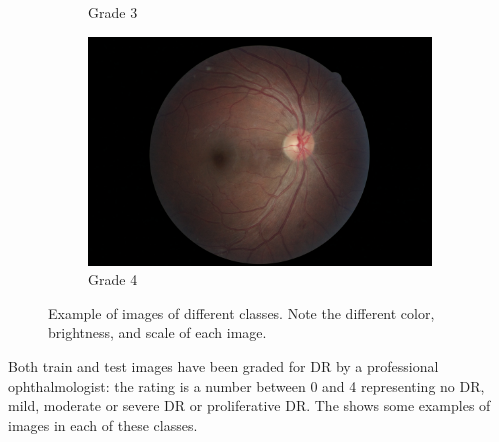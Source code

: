 \begin{figure}[htbp]
\begin{subfigure}[b]{0.19\textwidth}
        \caption{Grade 3}
     \end{subfigure}
     \hfill
     \begin{subfigure}[b]{0.19\textwidth}
        \centering
        \includegraphics[width=\textwidth, height=\textwidth]{figures/chapter4/Dataset/proliferative/352_right.jpeg}
        \caption{Grade 4}
    \end{subfigure}
    \caption{Example of images of different classes. Note the different color, brightness, and scale of each image. }
    \label{fig:disease_level}
\end{figure}

Both train and test images have been graded for DR by a professional ophthalmologist: the rating is a number between 0 and 4 representing no DR, mild, moderate or severe DR or proliferative DR. The   shows some examples of images in each of these classes.

